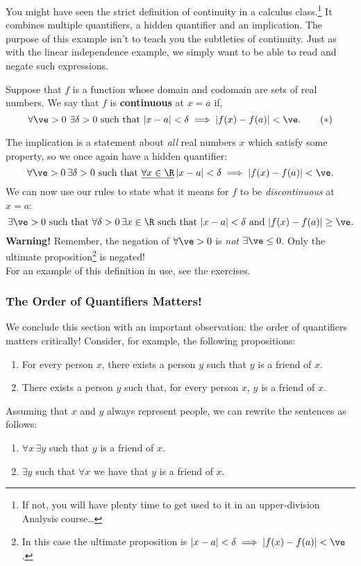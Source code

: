You might have seen the strict definition of continuity in a calculus class.\footnote{If not, you will have plenty time to get used to it in an upper-division Analysis course\ldots} It combines multiple quantifiers, a hidden quantifier and an implication. The purpose of this example isn't to teach you the subtleties of continuity. Just as with the linear independence example, we simply want to be able to read and negate such expressions.

\begin{defn}\label{defn:cont}
Suppose that $f$ is a function whose domain and codomain are sets of real numbers. We say that $f$ is \textbf{continuous} at $x=a$ if,
\[\forall\ve >0\ \exists\delta>0\text{ such that }|x-a|<\delta\implies |f(x)-f(a)|<\ve.\tag*{($\ast$)}\]
\end{defn}

\noindent The implication is a statement about \emph{all} real numbers $x$ which satisfy some property, so we once again have a hidden quantifier:
\[\forall\ve>0 \, \exists\delta>0\text{ such that }\underline{\forall x\in\R} \, |x-a|<\delta\implies |f(x)-f(a)|<\ve.\]
We can now use our rules to state what it means for $f$ to be \emph{discontinuous} at $x=a$:
\[\exists\ve>0\text{ such that }\forall\delta>0 \, \exists x\in\R\text{ such that }|x-a|<\delta\text{ and }|f(x)-f(a)|\ge\ve.\]
{\bf Warning!} Remember, the negation of $\forall\ve>0$ is \emph{not} $\exists\ve\le 0$. Only the ultimate proposition\footnote{In this case the ultimate proposition is $|x-a|<\delta\implies |f(x)-f(a)|<\ve$.} is negated!\\
For an example of this definition in use, see the exercises.

\subsubsection*{The Order of Quantifiers Matters!}

We conclude this section with an important observation: the order of quantifiers matters critically! Consider, for example, the following propositions: 
\begin{enumerate}
\item For every person $x$, there exists a person $y$ such that $y$ is a friend of $x$. 
\item There exists a person $y$ such that, for every person $x$, $y$ is a friend of $x$. 
\end{enumerate}
Assuming that $x$ and $y$ always represent people, we can rewrite the sentences as follows:
\begin{enumerate}
\item $\forall x \,\exists y$ such that $y$ is a friend of $x$.
\item $\exists y$ such that $\forall x$ we have that $y$ is a friend of $x$.
\end{enumerate}



